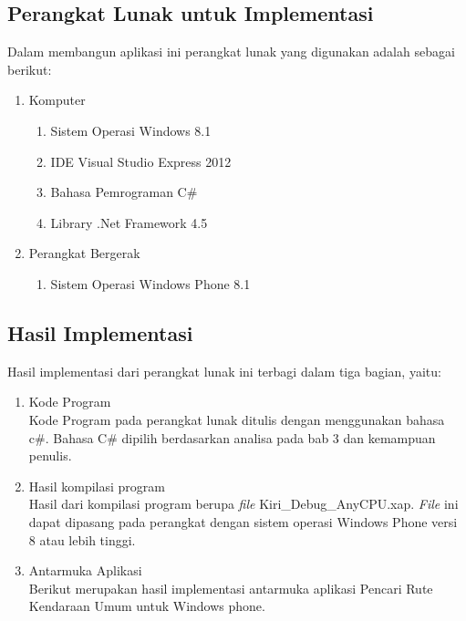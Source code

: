 \subsection{Perangkat Lunak untuk Implementasi}
\label{lab:Perangkat Lunak untuk Implementasi}
\hspace{0.5cm} Dalam membangun aplikasi ini perangkat lunak yang digunakan adalah sebagai berikut:
\begin{enumerate}
	\item Komputer
		\begin{enumerate}
			\item Sistem Operasi Windows 8.1
			\item IDE Visual Studio Express 2012
			\item Bahasa Pemrograman C\#
			\item Library .Net Framework 4.5
		\end{enumerate}
		
	\item Perangkat Bergerak
		\begin{enumerate}
			\item Sistem Operasi Windows Phone 8.1
		\end{enumerate}
\end{enumerate}

\subsection{Hasil Implementasi}
\label{lab:Hasil Implementasi}
\hspace{0.5cm} Hasil implementasi dari perangkat lunak ini terbagi dalam tiga bagian, yaitu:
\begin{enumerate}
	\item Kode Program \\
	Kode Program pada perangkat lunak ditulis dengan menggunakan bahasa c\#. Bahasa C\# dipilih berdasarkan analisa pada bab 3 dan kemampuan penulis.
	\item Hasil kompilasi program \\
	Hasil dari kompilasi program berupa \textit{file} Kiri\_Debug\_AnyCPU.xap. \textit{File} ini dapat dipasang pada perangkat dengan sistem operasi Windows Phone versi 8 atau lebih tinggi.
	\item Antarmuka Aplikasi \\
	Berikut merupakan hasil implementasi antarmuka aplikasi Pencari Rute Kendaraan Umum untuk Windows phone.
\end{enumerate}

